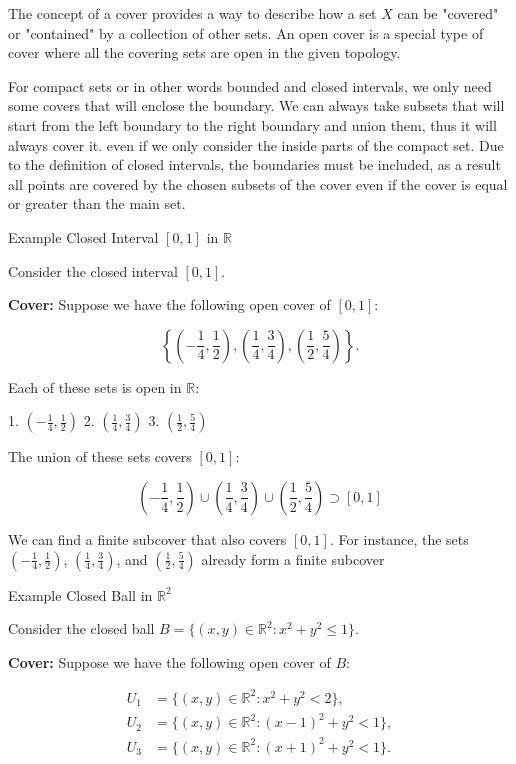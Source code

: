 \documentclass{article}
\begin{document}
The concept of a cover provides a way to describe how a set \( X \) can be "covered" or "contained" by a collection of other sets. An open cover is a special type of cover where all the covering sets are open in the given topology.

For compact sets or in other words bounded and closed intervals, we only need some covers that will enclose the boundary. We can always take subsets that will start from the left boundary to the right boundary and union them, thus it will always cover it. even if we only consider the inside parts of the compact set. Due to the definition of closed intervals, the boundaries must be included, as a result all points are covered by the chosen subsets of the cover even if the cover is equal or greater than the main set. 


Example Closed Interval \([0, 1]\) in \(\mathbb{R}\)

Consider the closed interval \([0, 1]\).

\textbf{Cover:} Suppose we have the following open cover of \([0, 1]\):

\[
\left\{ \left(-\frac{1}{4}, \frac{1}{2}\right), \left(\frac{1}{4}, \frac{3}{4}\right), \left(\frac{1}{2}, \frac{5}{4}\right) \right\}.
\]

Each of these sets is open in \(\mathbb{R}\):

1. \(\left(-\frac{1}{4}, \frac{1}{2}\right)\)
2. \(\left(\frac{1}{4}, \frac{3}{4}\right)\)
3. \(\left(\frac{1}{2}, \frac{5}{4}\right)\)

The union of these sets covers \([0, 1]\):

\[
\left(-\frac{1}{4}, \frac{1}{2}\right) \cup \left(\frac{1}{4}, \frac{3}{4}\right) \cup \left(\frac{1}{2}, \frac{5}{4}\right) \supset [0, 1]
\]

We can find a finite subcover that also covers \([0, 1]\). For instance, the sets \(\left(-\frac{1}{4}, \frac{1}{2}\right)\), \(\left(\frac{1}{4}, \frac{3}{4}\right)\), and \(\left(\frac{1}{2}, \frac{5}{4}\right)\) already form a finite subcover

Example Closed Ball in \(\mathbb{R}^2\)

Consider the closed ball \(B = \{ (x, y) \in \mathbb{R}^2 : x^2 + y^2 \leq 1 \}\).

\textbf{Cover:} Suppose we have the following open cover of \(B\):

\[
\begin{aligned}
U_1 &= \{ (x, y) \in \mathbb{R}^2 : x^2 + y^2 < 2 \}, \\
U_2 &= \{ (x, y) \in \mathbb{R}^2 : (x-1)^2 + y^2 < 1 \}, \\
U_3 &= \{ (x, y) \in \mathbb{R}^2 : (x+1)^2 + y^2 < 1 \}.
\end{aligned}
\]
\end{document}
